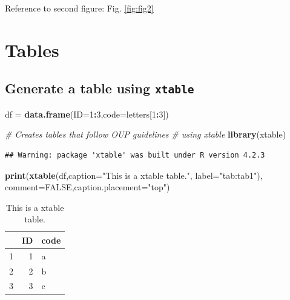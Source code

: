 \documentclass[webpdf,large,modern,namedate]{oup-authoring-template}
\newenvironment{Shaded}{\begin{snugshade}}{\end{snugshade}}
\newcommand{\AttributeTok}[1]{\textcolor[rgb]{0.13,0.29,0.53}{#1}}
\newcommand{\CommentTok}[1]{\textcolor[rgb]{0.56,0.35,0.01}{\textit{#1}}}
\newcommand{\ConstantTok}[1]{\textcolor[rgb]{0.56,0.35,0.01}{#1}}
\newcommand{\DecValTok}[1]{\textcolor[rgb]{0.00,0.00,0.81}{#1}}
\newcommand{\FunctionTok}[1]{\textcolor[rgb]{0.13,0.29,0.53}{\textbf{#1}}}
\newcommand{\NormalTok}[1]{#1}
\newcommand{\OtherTok}[1]{\textcolor[rgb]{0.56,0.35,0.01}{#1}}
\newcommand{\SpecialCharTok}[1]{\textcolor[rgb]{0.81,0.36,0.00}{\textbf{#1}}}
\newcommand{\StringTok}[1]{\textcolor[rgb]{0.31,0.60,0.02}{#1}}
\theoremstyle{thmstyleone}
\theoremstyle{thmstyletwo}
\theoremstyle{thmstylethree}
\begin{document}
Reference to second figure: Fig. \ref{fig:fig2}

\hypertarget{tables}{%
\section{Tables}\label{tables}}

\hypertarget{generate-a-table-using-xtable}{%
\subsection{\texorpdfstring{Generate a table using
\texttt{xtable}}{Generate a table using xtable}}\label{generate-a-table-using-xtable}}

\begin{Shaded}
\begin{Highlighting}[]
\NormalTok{df }\OtherTok{=} \FunctionTok{data.frame}\NormalTok{(}\AttributeTok{ID=}\DecValTok{1}\SpecialCharTok{:}\DecValTok{3}\NormalTok{,}\AttributeTok{code=}\NormalTok{letters[}\DecValTok{1}\SpecialCharTok{:}\DecValTok{3}\NormalTok{])}

\CommentTok{\# Creates tables that follow OUP guidelines }
\CommentTok{\# using xtable}
\FunctionTok{library}\NormalTok{(xtable) }
\end{Highlighting}
\end{Shaded}

\begin{verbatim}
## Warning: package 'xtable' was built under R version 4.2.3
\end{verbatim}

\begin{Shaded}
\begin{Highlighting}[]
\FunctionTok{print}\NormalTok{(}\FunctionTok{xtable}\NormalTok{(df,}\AttributeTok{caption=}\StringTok{"This is a xtable table."}\NormalTok{,}
             \AttributeTok{label=}\StringTok{"tab:tab1"}\NormalTok{),}
      \AttributeTok{comment=}\ConstantTok{FALSE}\NormalTok{,}\AttributeTok{caption.placement=}\StringTok{"top"}\NormalTok{)}
\end{Highlighting}
\end{Shaded}

\begin{table}[ht]
\centering
\caption{This is a xtable table.} 
\label{tab:tab1}
\begin{tabular}{rrl}
  \hline
 & ID & code \\ 
  \hline
1 &   1 & a \\ 
  2 &   2 & b \\ 
  3 &   3 & c \\ 
   \hline
\end{tabular}
\end{table}
\end{document}

